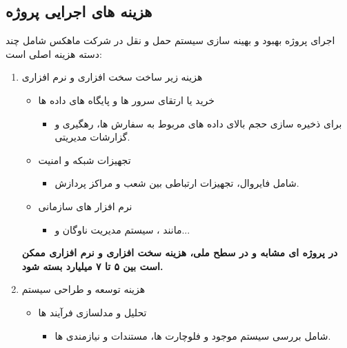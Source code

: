\documentclass[12pt,a4paper]{report}
\begin{document}
\subsection{هزینه های اجرایی پروژه}
اجرای پروژه بهبود و بهینه سازی سیستم حمل و نقل در شرکت ماهکس شامل چند دسته هزینه اصلی است:
\begin{enumerate}
	\item هزینه زیر ساخت  سخت افزاری و نرم افزاری
	\begin{itemize}
		\item خرید یا ارتقای سرور ها و پایگاه های داده ها
		\begin{itemize}
			\item 
برای ذخیره سازی حجم بالای داده های مربوط به سفارش ها، رهگیری  و گزارشات مدیریتی.
		\end{itemize}

		\item  تجهیزات شبکه و امنیت

		\begin{itemize}
			\item	شامل فایروال، تجهیزات ارتباطی بین شعب و مراکز پردازش.
		\end{itemize}
		\item 
نرم افزار های سازمانی 
		\begin{itemize}
			\item 
مانند ، سیستم مدیریت ناوگان و...
		\end{itemize}
	\end{itemize}	
\textbf{
در پروژه ای مشابه و در سطح ملی، هزینه سخت افزاری و نرم افزاری ممکن است بین ۵ تا ۷ میلیارد بسته شود.
}
	\item هزینه توسعه و طراحی سیستم
\begin{itemize}
	\item 
	تحلیل و مدلسازی فرآیند ها
	\begin{itemize}
		\item 
شامل بررسی سیستم موجود و فلوچارت ها، مستندات و نیازمندی ها.
	\end{itemize}
	

\end{itemize}
\end{enumerate}
\end{document}
